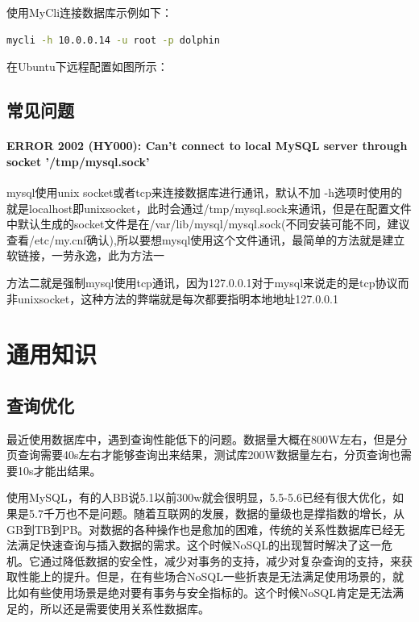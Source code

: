\documentclass[letter]{book}
\begin{document}
使用MyCli连接数据库示例如下：

\begin{lstlisting}[language=Bash]
mycli -h 10.0.0.14 -u root -p dolphin
\end{lstlisting}

在Ubuntu下远程配置如图\label{raspberryremtoeconfig}所示：

\subsection{常见问题}

\paragraph{ERROR 2002 (HY000): Can't connect to local MySQL server through socket '/tmp/mysql.sock'}

mysql使用unix socket或者tcp来连接数据库进行通讯，默认不加 -h选项时使用的就是localhost即unixsocket，此时会通过/tmp/mysql.sock来通讯，但是在配置文件中默认生成的socket文件是在/var/lib/mysql/mysql.sock(不同安装可能不同，建议查看/etc/my.cnf确认),所以要想mysql使用这个文件通讯，最简单的方法就是建立软链接，一劳永逸，此为方法一

方法二就是强制mysql使用tcp通讯，因为127.0.0.1对于mysql来说走的是tcp协议而非unixsocket，这种方法的弊端就是每次都要指明本地地址127.0.0.1

\section{通用知识}

\subsection{查询优化}

最近使用数据库中，遇到查询性能低下的问题。数据量大概在800W左右，但是分页查询需要40s左右才能够查询出来结果，测试库200W数据量左右，分页查询也需要10s才能出结果。

使用MySQL，有的人BB说5.1以前300w就会很明显，5.5-5.6已经有很大优化，如果是5.7千万也不是问题。随着互联网的发展，数据的量级也是撑指数的增长，从GB到TB到PB。对数据的各种操作也是愈加的困难，传统的关系性数据库已经无法满足快速查询与插入数据的需求。这个时候NoSQL的出现暂时解决了这一危机。它通过降低数据的安全性，减少对事务的支持，减少对复杂查询的支持，来获取性能上的提升。但是，在有些场合NoSQL一些折衷是无法满足使用场景的，就比如有些使用场景是绝对要有事务与安全指标的。这个时候NoSQL肯定是无法满足的，所以还是需要使用关系性数据库。
\end{document}
